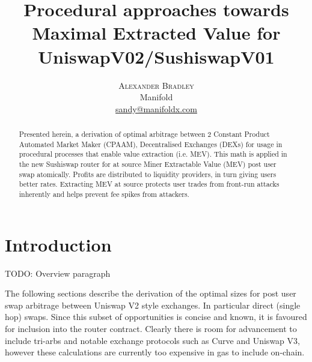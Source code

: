 \documentclass{article}
\author{%
	\textsc{Alexander Bradley} \\[1ex] %
	\normalsize Manifold \\ %
	\normalsize \href{mailto:sandy@manifoldx.com}{sandy@manifoldx.com} %
}
\begin{document}


\title{Procedural approaches towards Maximal Extracted Value for UniswapV02/SushiswapV01} %


	
	\maketitle
	
	
		\begin{abstract}
		Presented herein, a derivation of optimal arbitrage between 2 Constant Product Automated Market Maker (CPAAM), Decentralised Exchanges (DEXs) for usage in procedural processes that enable value extraction (i.e. MEV).
		 This math is applied in the new Sushiswap router for at source Miner Extractable Value (MEV) post user swap atomically. 
		Profits are distributed to liquidity providers, in turn giving users better rates. Extracting MEV at source protects user trades from front-run attacks inherently and helps prevent fee spikes from attackers.
	\end{abstract}
	
	\newpage
	
	\section{Introduction}

    TODO: Overview paragraph 
    
	
	The following sections describe the derivation of the optimal sizes for post user swap arbitrage between Uniswap V2 style exchanges.
	 In particular direct (single hop) swaps. Since this subset of opportunities is concise and known, it is favoured for inclusion into the router contract. Clearly there is room for advancement to include tri-arbs and notable exchange protocols such as Curve and Uniswap V3, however these calculations are currently too expensive in gas to include on-chain. 
	
\end{document}
